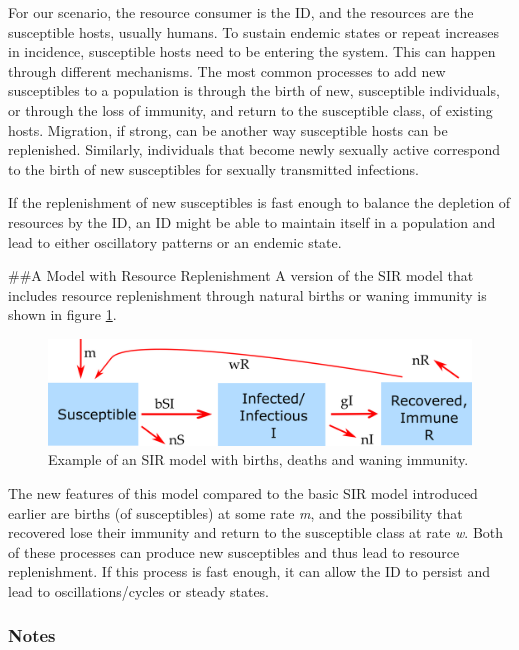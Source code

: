 \documentclass[]{book}
\theoremstyle{definition}
\theoremstyle{definition}
\theoremstyle{definition}
\theoremstyle{remark}
\begin{document}
For our scenario, the resource consumer is the ID, and the resources are
the susceptible hosts, usually humans. To sustain endemic states or
repeat increases in incidence, susceptible hosts need to be entering the
system. This can happen through different mechanisms. The most common
processes to add new susceptibles to a population is through the birth
of new, susceptible individuals, or through the loss of immunity, and
return to the susceptible class, of existing hosts. Migration, if
strong, can be another way susceptible hosts can be replenished.
Similarly, individuals that become newly sexually active correspond to
the birth of new susceptibles for sexually transmitted infections.

If the replenishment of new susceptibles is fast enough to balance the
depletion of resources by the ID, an ID might be able to maintain itself
in a population and lead to either oscillatory patterns or an endemic
state.

\#\#A Model with Resource Replenishment A version of the SIR model that
includes resource replenishment through natural births or waning
immunity is shown in figure \ref{fig:birthdeathdmodel}.

\begin{figure}
\centering
\includegraphics{./images/R0modelfigure.png}
\caption{\label{fig:birthdeathdmodel}Example of an SIR model with births,
deaths and waning immunity.}
\end{figure}

The new features of this model compared to the basic SIR model
introduced earlier are births (of susceptibles) at some rate \emph{m},
and the possibility that recovered lose their immunity and return to the
susceptible class at rate \emph{w}. Both of these processes can produce
new susceptibles and thus lead to resource replenishment. If this
process is fast enough, it can allow the ID to persist and lead to
oscillations/cycles or steady states.

\hypertarget{mynotebox}{%
\subsubsection{Notes}\label{mynotebox}}
\end{document}

